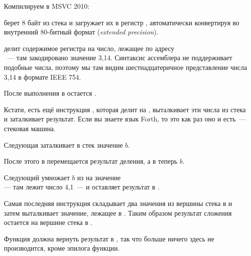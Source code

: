 
Компилируем в MSVC 2010:



\FLD берет 8 байт из стека и загружает их в регистр , автоматически конвертируя во внутренний 
80-битный формат (\emph{extended precision}).

\FDIV делит содержимое регистра  на число, лежащее по адресу \\
~--- 
там закодировано значение 3,14. Синтаксис ассемблера не поддерживает подобные числа, 
поэтому мы там видим шестнадцатеричное представление числа 3,14 в формате IEEE 754.

После выполнения \FDIV в  остается .

Кстати, есть ещё инструкция \FDIVP, которая делит  на , 
выталкивает эти числа из стека и заталкивает результат. 
Если вы знаете язык Forth, то это как раз оно и есть~--- стековая машина.

Следующая \FLD заталкивает в стек значение $b$.

После этого в  перемещается результат деления, а в  теперь $b$.

Следующий \FMUL умножает $b$ из  на значение \\
 --- там лежит число 4,1~--- и оставляет результат в .

Самая последняя инструкция \FADDP складывает два значения из вершины стека 
в  и затем выталкивает значение, лежащее в . 
Таким образом результат сложения остается на вершине стека в .

Функция должна вернуть результат в , так что больше ничего здесь не производится, 
кроме эпилога функции.



